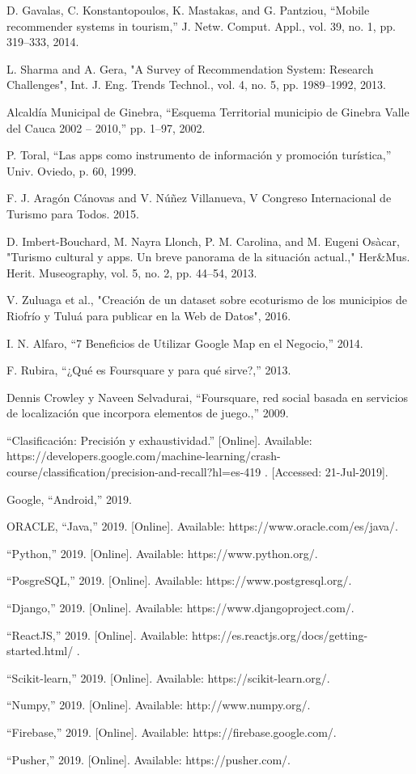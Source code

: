 \documentclass[12pt,letterpaper,openany]{book}
\begin{document}
\begin{thebibliography}{1}
 D. Gavalas, C. Konstantopoulos, K. Mastakas, and G. Pantziou, “Mobile recommender systems in tourism,” J. Netw. Comput. Appl., vol. 39, no. 1, pp. 319–333, 2014.

 L. Sharma and A. Gera, "A Survey of Recommendation System: Research Challenges", Int. J. Eng. Trends Technol., vol. 4, no. 5, pp. 1989–1992, 2013.

 Alcaldía Municipal de Ginebra, “Esquema Territorial municipio de Ginebra Valle del Cauca 2002 – 2010,” pp. 1–97, 2002.

 P. Toral, “Las apps como instrumento de información y promoción turística,” Univ. Oviedo, p. 60, 1999.

 F. J. Aragón Cánovas and V. Núñez Villanueva, V Congreso Internacional de Turismo para Todos. 2015.

 D. Imbert-Bouchard, M. Nayra Llonch, P. M. Carolina, and M. Eugeni Osàcar, "Turismo cultural y apps. Un breve panorama de la situación actual.," Her\&Mus. Herit. Museography, vol. 5, no. 2, pp. 44–54, 2013.

 V. Zuluaga et al., "Creación de un dataset sobre ecoturismo de los municipios de Riofrío y Tuluá para publicar en la Web de Datos", 2016.

 I. N. Alfaro, “7 Beneficios de Utilizar Google Map en el Negocio,” 2014.

 F. Rubira, “¿Qué es Foursquare y para qué sirve?,” 2013. 

 Dennis Crowley y Naveen Selvadurai, “Foursquare, red social basada en servicios de localización que incorpora elementos de juego.,” 2009.

 “Clasificación: Precisión y exhaustividad.” [Online]. Available: https://developers.google.com/machine-learning/crash-course/classification/precision-and-recall?hl=es-419 . [Accessed: 21-Jul-2019].

 Google, “Android,” 2019.

 ORACLE, “Java,” 2019. [Online]. Available: https://www.oracle.com/es/java/.

 “Python,” 2019. [Online]. Available: https://www.python.org/.

 “PosgreSQL,” 2019. [Online]. Available: https://www.postgresql.org/.

 “Django,” 2019. [Online]. Available: https://www.djangoproject.com/.

 “ReactJS,” 2019. [Online]. Available: https://es.reactjs.org/docs/getting-started.html/ .

 “Scikit-learn,” 2019. [Online]. Available: https://scikit-learn.org/.

 “Numpy,” 2019. [Online]. Available: http://www.numpy.org/.

 “Firebase,” 2019. [Online]. Available: https://firebase.google.com/.

 “Pusher,” 2019. [Online]. Available: https://pusher.com/.


\end{thebibliography}
\end{document}
